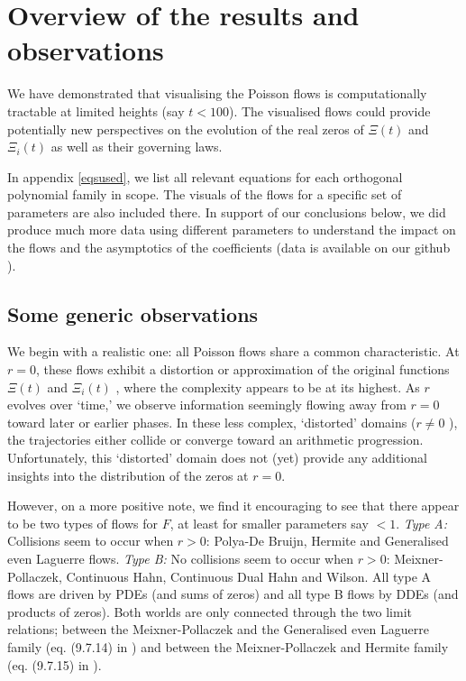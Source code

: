 \documentclass[a4paper,11pt,twoside]{amsart}
\begin{document}
\section{Overview of the results and observations} \label{results}
We have demonstrated that visualising the Poisson flows is computationally tractable at limited heights (say $t < 100$). The visualised flows could provide potentially new perspectives on the evolution of the real zeros of $\Xi(t)$ and $\Xi_i(t)$ as well as their governing laws.

In appendix \ref{eqsused}, we list all relevant equations for each orthogonal polynomial family in scope. The visuals of the flows for a specific set of parameters are also included there. In support of our conclusions below, we did produce much more data using different parameters to understand the impact on the flows and the asymptotics of the coefficients (data is available on our github \cite{git}). 

\subsection{Some generic observations}

We begin with a realistic one: all Poisson flows share a common characteristic. At  $r = 0$, these flows exhibit a distortion or approximation of the original functions  $\Xi(t)$  and  $\Xi_i(t)$ , where the complexity appears to be at its highest. As  $r$  evolves over ‘time,’ we observe information seemingly flowing away from  $r = 0$  toward later or earlier phases. In these less complex, ‘distorted’ domains ($ r \ne 0$ ), the trajectories either collide or converge toward an arithmetic progression. Unfortunately, this ‘distorted’ domain does not (yet) provide any additional insights into the distribution of the zeros at  $r = 0$.

However, on a more positive note, we find it encouraging to see that there appear to be two types of flows for $F$, at least for smaller parameters say $<1$. \textit{Type A:} Collisions seem to occur when $r > 0$: Polya-De Bruijn, Hermite and Generalised even Laguerre flows. \textit{Type B:} No collisions seem to occur when $r > 0$: Meixner-Pollaczek, Continuous Hahn, Continuous Dual Hahn and Wilson. All type A flows are driven by PDEs (and sums of zeros) and all type B flows by DDEs (and products of zeros). Both worlds are only connected through the two limit relations; between the Meixner-Pollaczek and the Generalised even Laguerre family (eq. (9.7.14) in \cite{koe}) and between the Meixner-Pollaczek and Hermite family (eq. (9.7.15) in \cite{koe}). 
\end{document}
